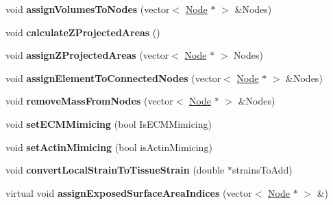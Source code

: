 \begin{DoxyCompactItemize}
\item 
\hypertarget{classShapeBase_acee26103666067517d905b32edfbf302}{}void {\bfseries assign\+Volumes\+To\+Nodes} (vector$<$ \hyperlink{classNode}{Node} $\ast$ $>$ \&Nodes)\label{classShapeBase_acee26103666067517d905b32edfbf302}

\item 
\hypertarget{classShapeBase_a4bc9c0bb828f73c105321fd5a25be8cc}{}void {\bfseries calculate\+Z\+Projected\+Areas} ()\label{classShapeBase_a4bc9c0bb828f73c105321fd5a25be8cc}

\item 
\hypertarget{classShapeBase_aec0c4844fb49f5e54ab31826ecbf6e31}{}void {\bfseries assign\+Z\+Projected\+Areas} (vector$<$ \hyperlink{classNode}{Node} $\ast$ $>$ Nodes)\label{classShapeBase_aec0c4844fb49f5e54ab31826ecbf6e31}

\item 
\hypertarget{classShapeBase_a20cc141f0484b0c488619ef6727eb820}{}void {\bfseries assign\+Element\+To\+Connected\+Nodes} (vector$<$ \hyperlink{classNode}{Node} $\ast$ $>$ \&Nodes)\label{classShapeBase_a20cc141f0484b0c488619ef6727eb820}

\item 
\hypertarget{classShapeBase_a6d09a632b94b324a3bde18a43b31adb8}{}void {\bfseries remove\+Mass\+From\+Nodes} (vector$<$ \hyperlink{classNode}{Node} $\ast$ $>$ \&Nodes)\label{classShapeBase_a6d09a632b94b324a3bde18a43b31adb8}

\item 
\hypertarget{classShapeBase_a48f114984fe31a847a9b5485d4622ca1}{}void {\bfseries set\+E\+C\+M\+Mimicing} (bool Is\+E\+C\+M\+Mimicing)\label{classShapeBase_a48f114984fe31a847a9b5485d4622ca1}

\item 
\hypertarget{classShapeBase_ac42c9ed461be059e0558740ed965a8d6}{}void {\bfseries set\+Actin\+Mimicing} (bool is\+Actin\+Mimicing)\label{classShapeBase_ac42c9ed461be059e0558740ed965a8d6}

\item 
\hypertarget{classShapeBase_ad023a96503929e72c59adb2b7ba8fcdf}{}void {\bfseries convert\+Local\+Strain\+To\+Tissue\+Strain} (double $\ast$strains\+To\+Add)\label{classShapeBase_ad023a96503929e72c59adb2b7ba8fcdf}

\item 
\hypertarget{classShapeBase_ab3b44c25be3950c094c5eaee16d3716d}{}virtual void {\bfseries assign\+Exposed\+Surface\+Area\+Indices} (vector$<$ \hyperlink{classNode}{Node} $\ast$ $>$ \&)\label{classShapeBase_ab3b44c25be3950c094c5eaee16d3716d}


\end{DoxyCompactItemize}
